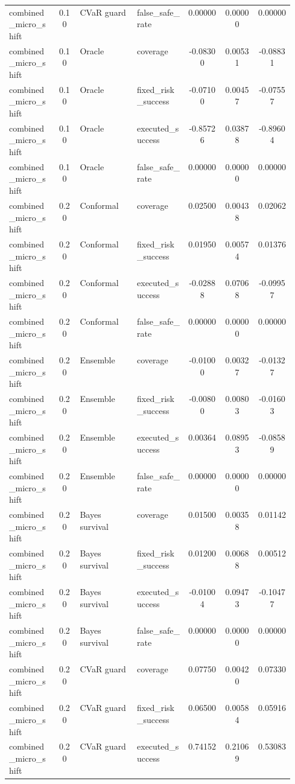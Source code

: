 \documentclass{article}
\begin{document}
\begin{center}
\begin{longtable}{p{0.17\linewidth}cp{0.20\linewidth}p{0.18\linewidth}ccc}
combined\_micro\_shift & 0.10 & CVaR guard & false\_safe\_rate & 0.00000 & 0.00000 & 0.00000\\
combined\_micro\_shift & 0.10 & Oracle & coverage & -0.08300 & 0.00531 & -0.08831\\
combined\_micro\_shift & 0.10 & Oracle & fixed\_risk\_success & -0.07100 & 0.00457 & -0.07557\\
combined\_micro\_shift & 0.10 & Oracle & executed\_success & -0.85726 & 0.03878 & -0.89604\\
combined\_micro\_shift & 0.10 & Oracle & false\_safe\_rate & 0.00000 & 0.00000 & 0.00000\\
combined\_micro\_shift & 0.20 & Conformal & coverage & 0.02500 & 0.00438 & 0.02062\\
combined\_micro\_shift & 0.20 & Conformal & fixed\_risk\_success & 0.01950 & 0.00574 & 0.01376\\
combined\_micro\_shift & 0.20 & Conformal & executed\_success & -0.02888 & 0.07068 & -0.09957\\
combined\_micro\_shift & 0.20 & Conformal & false\_safe\_rate & 0.00000 & 0.00000 & 0.00000\\
combined\_micro\_shift & 0.20 & Ensemble & coverage & -0.01000 & 0.00327 & -0.01327\\
combined\_micro\_shift & 0.20 & Ensemble & fixed\_risk\_success & -0.00800 & 0.00803 & -0.01603\\
combined\_micro\_shift & 0.20 & Ensemble & executed\_success & 0.00364 & 0.08953 & -0.08589\\
combined\_micro\_shift & 0.20 & Ensemble & false\_safe\_rate & 0.00000 & 0.00000 & 0.00000\\
combined\_micro\_shift & 0.20 & Bayes survival & coverage & 0.01500 & 0.00358 & 0.01142\\
combined\_micro\_shift & 0.20 & Bayes survival & fixed\_risk\_success & 0.01200 & 0.00688 & 0.00512\\
combined\_micro\_shift & 0.20 & Bayes survival & executed\_success & -0.01004 & 0.09473 & -0.10477\\
combined\_micro\_shift & 0.20 & Bayes survival & false\_safe\_rate & 0.00000 & 0.00000 & 0.00000\\
combined\_micro\_shift & 0.20 & CVaR guard & coverage & 0.07750 & 0.00420 & 0.07330\\
combined\_micro\_shift & 0.20 & CVaR guard & fixed\_risk\_success & 0.06500 & 0.00584 & 0.05916\\
combined\_micro\_shift & 0.20 & CVaR guard & executed\_success & 0.74152 & 0.21069 & 0.53083\\

\end{longtable}
\end{center}
\end{document}
